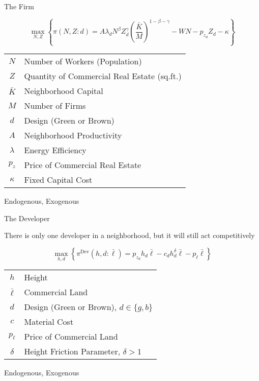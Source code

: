 \documentclass[11pt]{beamer}
\begin{document}
\begin{frame}{The Firm}

$$\max_{N, Z} \left\{ \pi(N, Z:d) = A\lambda_d N^\beta Z_d^\gamma \left(\frac{\bar{K}}{M}\right)^{1-\beta-\gamma} - WN - p_{z_{d}} Z_d - \kappa \right\}$$

\centering
\begin{tabular}{c l}
$N$ & \alert{Number of Workers (Population)}\\
$Z$ & \alert{Quantity of Commercial Real Estate (sq.ft.)}\\
$\bar{K}$ & Neighborhood Capital \\
$M$ & \alert{Number of Firms} \\
$d$ & \alert{Design (Green or Brown)} \\
$A$ & Neighborhood Productivity \\
$\lambda$ & Energy Efficiency \\
$p_{z}$ & \alert{Price of Commercial Real Estate} \\
$\kappa$ & Fixed Capital Cost
\end{tabular}

\vfill
\alert{Endogenous}, Exogenous

\end{frame}


\begin{frame}{The Developer}

There is only one developer in a neighborhood, but it will still act competitively

$$\max_{h, d} \left\{  \pi^\text{Dev}(h,d:\bar{\ell}) = p_{z_d} h_d \bar{\ell} -  c_d h_d^\delta \bar{\ell} - p_\ell \bar{\ell}\right\}$$

\vfill
\centering
\begin{tabular}{c l}
$h$ & \alert{Height} \\
$\bar{\ell}$ & Commercial Land \\
$d$ & \alert{Design (Green or Brown), $d\in \{g, b\}$} \\
$c$ & Material Cost \\
$p_\ell$ & \alert{Price of Commercial Land}\\
$\delta$ & Height Friction Parameter, $\delta > 1$
\end{tabular}

\vfill
\alert{Endogenous}, Exogenous

\end{frame}
\end{document}
